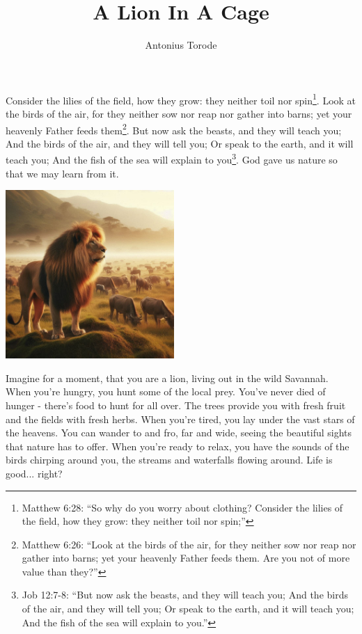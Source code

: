 \documentclass[10pt]{article}
\title{A Lion In A Cage}
\author{Antonius Torode}
\begin{document}
\maketitle
\thispagestyle{fancy}

\begin{multicols}{2}


Consider the lilies of the field, how they grow: they neither toil nor spin\footnote{Matthew 6:28: ``So why do you worry about clothing? Consider the lilies of the field, how they grow: they neither toil nor spin;''}. Look at the birds of the air, for they neither sow nor reap nor gather into barns; yet your heavenly Father feeds them\footnote{Matthew 6:26: ``Look at the birds of the air, for they neither sow nor reap nor gather into barns; yet your heavenly Father feeds them. Are you not of more value than they?''}. But now ask the beasts, and they will teach you; And the birds of the air, and they will tell you; Or speak to the earth, and it will teach you; And the fish of the sea will explain to you\footnote{Job 12:7-8: ``But now ask the beasts, and they will teach you; And the birds of the air, and they will tell you; Or speak to the earth, and it will teach you; And the fish of the sea will explain to you.''}. God gave us nature so that we may learn from it.

\begin{center}
	\includegraphics[width=0.48\textwidth]{lion.jpeg}
\end{center}

Imagine for a moment, that you are a lion, living out in the wild Savannah. When you're hungry, you hunt some of the local prey. You've never died of hunger - there's food to hunt for all over. The trees provide you with fresh fruit and the fields with fresh herbs. When you're tired, you lay under the vast stars of the heavens. You can wander to and fro, far and wide, seeing the beautiful sights that nature has to offer. When you're ready to relax, you have the sounds of the birds chirping around you, the streams and waterfalls flowing around. Life is good... right?


\end{multicols}
\end{document}
